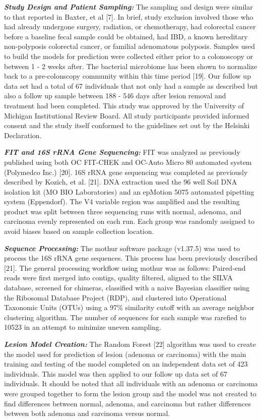 \documentclass[12pt,]{article}
\begin{document}
\textbf{\emph{Study Design and Patient Sampling:}} The sampling and
design were similar to that reported in Baxter, et al {[}7{]}. In brief,
study exclusion involved those who had already undergone surgery,
radiation, or chemotherapy, had colorectal cancer before a baseline
fecal sample could be obtained, had IBD, a known hereditary
non-polyposis colorectal cancer, or familial adenomatous polyposis.
Samples used to build the models for prediction were collected either
prior to a colonoscopy or between 1 - 2 weeks after. The bacterial
microbiome has been shown to normalize back to a pre-colonscopy
community within this time period {[}19{]}. Our follow up data set had a
total of 67 individuals that not only had a sample as described but also
a follow up sample between 188 - 546 days after lesion removal and
treatment had been completed. This study was approved by the University
of Michigan Institutional Review Board. All study participants provided
informed consent and the study itself conformed to the guidelines set
out by the Helsinki Declaration.

\textbf{\emph{FIT and 16S rRNA Gene Sequencing:}} FIT was analyzed as
previously published using both OC FIT-CHEK and OC-Auto Micro 80
automated system (Polymedco Inc.) {[}20{]}. 16S rRNA gene sequencing was
completed as previously described by Kozich, et al. {[}21{]}. DNA
extraction used the 96 well Soil DNA isolation kit (MO BIO Laboratories)
and an epMotion 5075 automated pipetting system (Eppendorf). The V4
variable region was amplified and the resulting product was split
between three sequencing runs with normal, adenoma, and carcinoma evenly
represented on each run. Each group was randomly assigned to avoid
biases based on sample collection location.

\textbf{\emph{Sequence Processing:}} The mothur software package
(v1.37.5) was used to process the 16S rRNA gene sequences. This process
has been previously described {[}21{]}. The general processing workflow
using mothur was as follows: Paired-end reads were first merged into
contigs, quality filtered, aligned to the SILVA database, screened for
chimeras, classified with a naive Bayesian classifier using the
Ribosomal Database Project (RDP), and clustered into Operational
Taxonomic Units (OTUs) using a 97\% similarity cutoff with an average
neighbor clustering algorithm. The number of sequences for each sample
was rarefied to 10523 in an attempt to minimize uneven sampling.

\textbf{\emph{Lesion Model Creation:}} The Random Forest {[}22{]}
algorithm was used to create the model used for prediction of lesion
(adenoma or carcinoma) with the main training and testing of the model
completed on an independent data set of 423 individuals. This model was
then applied to our follow up data set of 67 individuals. It should be
noted that all individuals with an adenoma or carcinoma were grouped
together to form the lesion group and the model was not created to find
differences between normal, adenoma, and carcinoma but rather
differences between both adenoma and carcinoma versus normal.
\end{document}
